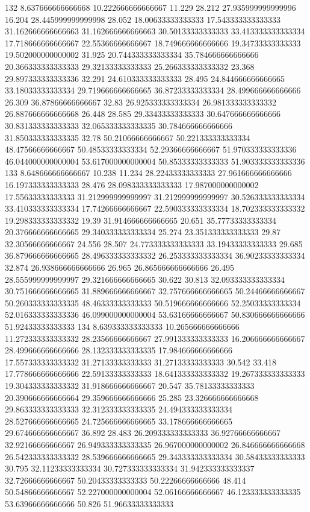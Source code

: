 132 8.637666666666668 10.222666666666667 11.229 28.212 27.935999999999996 16.204 28.445999999999998 28.052 18.00633333333333 17.543333333333333 31.162666666666663 31.162666666666663 30.50133333333333 33.413333333333334 17.718666666666667 22.55366666666667 18.749666666666666 19.34733333333333 19.502000000000002 31.925 20.744333333333334 35.784666666666666 20.366333333333333 29.32133333333333 25.266333333333332 23.368 29.897333333333336 32.291 24.610333333333333 28.495 24.844666666666665 33.18033333333334 29.719666666666665 36.87233333333334 28.499666666666666 26.309 36.87866666666667 32.83 26.925333333333334 26.981333333333332 26.887666666666668 26.448 28.585 29.33433333333333 30.647666666666666 30.831333333333333 32.065333333333335 30.784666666666666 31.850333333333335 32.78 50.21066666666667 50.221333333333334 48.47566666666667 50.48533333333334 52.29366666666667 51.970333333333336 46.044000000000004 53.617000000000004 50.85333333333333 51.903333333333336
133 8.648666666666667 10.238 11.234 28.22433333333333 27.961666666666666 16.197333333333333 28.476 28.098333333333333 17.987000000000002 17.55633333333333 31.212999999999997 31.212999999999997 30.526333333333334 33.410333333333334 17.74266666666667 22.590333333333334 18.702333333333332 19.298333333333332 19.39 31.914666666666665 20.651 35.77733333333334 20.376666666666665 29.340333333333334 25.274 23.351333333333333 29.87 32.30566666666667 24.556 28.507 24.773333333333333 33.19433333333333 29.685 36.879666666666665 28.496333333333332 26.253333333333334 36.90233333333334 32.874 26.938666666666666 26.965 26.865666666666666 26.495 28.555999999999997 29.321666666666665 30.622 30.813 32.093333333333334 30.751666666666665 31.889666666666667 32.757666666666665 50.24466666666667 50.260333333333335 48.46333333333333 50.519666666666666 52.25033333333334 52.016333333333336 46.099000000000004 53.63166666666667 50.830666666666666 51.92433333333333
134 8.639333333333333 10.265666666666666 11.272333333333332 28.23566666666667 27.991333333333333 16.206666666666667 28.499666666666666 28.132333333333335 17.984666666666666 17.557333333333332 31.27133333333333 31.27133333333333 30.542 33.418 17.778666666666666 22.59133333333333 18.641333333333332 19.267333333333333 19.304333333333332 31.918666666666667 20.547 35.78133333333333 20.390666666666664 29.359666666666666 25.285 23.326666666666668 29.863333333333333 32.312333333333335 24.494333333333334 28.527666666666665 24.725666666666665 33.178666666666665 29.674666666666667 36.892 28.483 26.209333333333333 36.92766666666667 32.92166666666667 26.949333333333335 26.967000000000002 26.846666666666668 26.542333333333332 28.539666666666665 29.343333333333334 30.58433333333333 30.795 32.11233333333334 30.727333333333334 31.942333333333337 32.72666666666667 50.20433333333333 50.22266666666666 48.414 50.54866666666667 52.227000000000004 52.06166666666667 46.123333333333335 53.63966666666666 50.826 51.96633333333333
